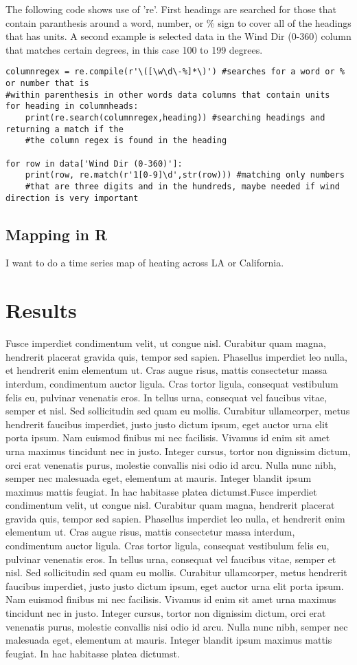 \documentclass[letterpaper]{article}
\begin{document}
The following code shows use of 're'. First headings are searched for those that contain paranthesis around a word, number, or \% sign to cover all of the headings that has units. A second example is selected data in the Wind Dir (0-360) column that matches certain degrees, in this case 100 to 199 degrees.
\begin{lstlisting}
columnregex = re.compile(r'\([\w\d\-%]*\)') #searches for a word or % or number that is
#within parenthesis in other words data columns that contain units
for heading in columnheads:
    print(re.search(columnregex,heading)) #searching headings and returning a match if the
    #the column regex is found in the heading

for row in data['Wind Dir (0-360)']: 
    print(row, re.match(r'1[0-9]\d',str(row))) #matching only numbers 
    #that are three digits and in the hundreds, maybe needed if wind direction is very important 
\end{lstlisting}
\subsection{Mapping in R}
I want to do a time series map of heating across LA or California. 
\section{Results}
Fusce imperdiet condimentum velit, ut congue nisl. Curabitur quam magna, hendrerit placerat gravida quis, tempor sed sapien. Phasellus imperdiet leo nulla, et hendrerit enim elementum ut. Cras augue risus, mattis consectetur massa interdum, condimentum auctor ligula. Cras tortor ligula, consequat vestibulum felis eu, pulvinar venenatis eros. In tellus urna, consequat vel faucibus vitae, semper et nisl. Sed sollicitudin sed quam eu mollis. Curabitur ullamcorper, metus hendrerit faucibus imperdiet, justo justo dictum ipsum, eget auctor urna elit porta ipsum. Nam euismod finibus mi nec facilisis. Vivamus id enim sit amet urna maximus tincidunt nec in justo. Integer cursus, tortor non dignissim dictum, orci erat venenatis purus, molestie convallis nisi odio id arcu. Nulla nunc nibh, semper nec malesuada eget, elementum at mauris. Integer blandit ipsum maximus mattis feugiat. In hac habitasse platea dictumst.Fusce imperdiet condimentum velit, ut congue nisl. Curabitur quam magna, hendrerit placerat gravida quis, tempor sed sapien. Phasellus imperdiet leo nulla, et hendrerit enim elementum ut. Cras augue risus, mattis consectetur massa interdum, condimentum auctor ligula. Cras tortor ligula, consequat vestibulum felis eu, pulvinar venenatis eros. In tellus urna, consequat vel faucibus vitae, semper et nisl. Sed sollicitudin sed quam eu mollis. Curabitur ullamcorper, metus hendrerit faucibus imperdiet, justo justo dictum ipsum, eget auctor urna elit porta ipsum. Nam euismod finibus mi nec facilisis. Vivamus id enim sit amet urna maximus tincidunt nec in justo. Integer cursus, tortor non dignissim dictum, orci erat venenatis purus, molestie convallis nisi odio id arcu. Nulla nunc nibh, semper nec malesuada eget, elementum at mauris. Integer blandit ipsum maximus mattis feugiat. In hac habitasse platea dictumst. 
\end{document}
